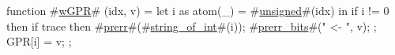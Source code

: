 function #\hyperref[sailMIPSzwGPR]{wGPR}# (idx, v) = {
  let i as atom(_) = #\hyperref[sailMIPSzunsigned]{unsigned}#(idx) in
  if i != 0 then {
    if trace then {
      #\hyperref[sailMIPSzprerr]{prerr}#(#\hyperref[sailMIPSzstringzyofzyint]{string\_of\_int}#(i));
      #\hyperref[sailMIPSzprerrzybits]{prerr\_bits}#(" <- ", v);
    };
    GPR[i] = v;
  };
}

